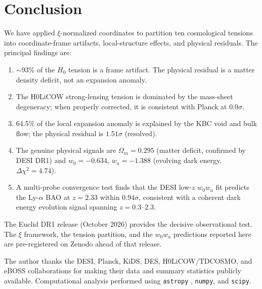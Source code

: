 \documentclass[twocolumn]{aastex631}
\begin{document}

\section{Conclusion}

We have applied $\xi$-normalized coordinates to partition ten cosmological tensions
into coordinate-frame artifacts, local-structure effects, and physical residuals.
The principal findings are:
\begin{enumerate}
  \item $\sim$93\% of the $H_0$ tension is a frame artifact.
        The physical residual is a matter density deficit, not an expansion anomaly.
  \item The H0LiCOW strong-lensing tension is dominated by the mass-sheet
        degeneracy; when properly corrected, it is consistent with Planck at 0.0$\sigma$.
  \item 64.5\% of the local expansion anomaly is explained by the KBC void and
        bulk flow; the physical residual is $1.51\sigma$ (resolved).
  \item The genuine physical signals are $\Omega_m = 0.295$ (matter deficit,
        confirmed by DESI DR1) and $w_0 = -0.634$, $w_a = -1.388$ (evolving
        dark energy, $\Delta\chi^2 = 4.74$).
  \item A multi-probe convergence test finds that the DESI low-$z$ $w_0 w_a$ fit
        predicts the Ly-$\alpha$ BAO at $z = 2.33$ within $0.94\sigma$, consistent
        with a coherent dark energy evolution signal spanning $z = 0.3$--$2.3$.
\end{enumerate}

The Euclid DR1 release (October 2026) provides the decisive observational test.
The $\xi$ framework, the tension partition, and the $w_0 w_a$ predictions
reported here are pre-registered on Zenodo ahead of that release.

\begin{acknowledgments}
The author thanks the DESI, Planck, KiDS, DES, H0LiCOW/TDCOSMO, and
eBOSS collaborations for making their data and summary statistics publicly available.
Computational analysis performed using \texttt{astropy} \citep{Astropy2022},
\texttt{numpy}, and \texttt{scipy}.
\end{acknowledgments}
\end{document}
